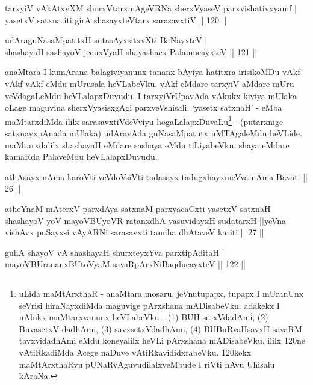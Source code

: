 \begin{shl}
tarxyiV vAkAtxvXM shorxVtarxmAgeVRNa sherxVyaseV parxvishativxyamf | \\
yasetxV satxna iti girA shasayxteV\s tarx sarasavxtiV \hfill|| 120 || 
\end{shl}

\begin{shl}
udAraguNasaMpatitxH sutasAyxsitxvXti BaNayxteV | \\
shashayaH sashayoV jecnxVyaH shayashacx PalamucayxteV \hfill|| 121 || 
\end{shl}

\begin{artha}
anaMtara I kumArana balagiviyanunx tananx bAyiya hatitxra irisikoMDu 
vAkf vAkf vAkf eMdu mUrusala heVLabeVku. vAkf eMdare tarxyiV aMdare 
mUru veVdagaLeMdu heVLalapxDuvudu. I tarxyiVrUpavAda vAkukx kiviya 
mUlaka oLage maguvina sherxVyasisxgAgi parxveVshisali. `yasetx satxnaH' 
- eMba maMtarxdiMda ililx sarasavxtiVdeVviyu 
hogaLalapxDuvaLu\footnote{uLida maMtArxthaR - anaMtara mosaru, 
jeVnutupapx, tupapx I mUranUnx seVrisi hiraNayxdiMda maguvige 
pArxshana mADisabeVku. adakekx I nAlukx maMtarxvanunx heVLabeVku - (1) 
BUH setxVdadAmi, (2) BuvasetxV dadhAmi, (3) savxsetxVdadhAmi, (4) 
BUBuRvaHsavxH savaRM tavxyidadhAmi eMdu koneyalilx heVLi pArxshana 
mADisabeVku. ililx 120ne vAtiRkadiMda Acege naDuve 
vAtiRkavididxrabeVku. 120kekx maMtArxthaRvu pUNaRvAguvudilalxveMbude I 
riVti nAvu Uhisalu kAraNa.} - (putarxnige satxnayxpAnada mUlaka) 
udAravAda guNasaMpatutx uMTAgaleMdu heVLide. maMtarxdalilx shashayaH 
eMdare sashaya eMdu tiLiyabeVku. shaya eMdare kamaRda PalaveMdu 
heVLalapxDuvudu.
\end{artha}

\begin{kandikeshl}
athAsayx nAma karoVti veVdoV\s siVti tadasayx tadugxhayxmeVva nAma Bavati || 26 ||
\end{kandikeshl}

\begin{kandikeshl}
atheYnaM mAterxV parxdAya satxnaM parxyacaCxti yasetxV satxnaH shashayoV yoV mayoVBUyoVR ratanxdhA vasuvidayxH sudatarxH ||yeVna vishAvx puSayxsi vAyARNi sarasavxti tamiha dhAtaveV kariti || 27 ||
\end{kandikeshl}

\begin{shl}
guhA shayoV vA shashayaH shurxteyxYva parxtipAditaH | \\
mayoVBUrananxBUtoV\s yaM savaRpArxNiBaqducayxteV \hfill|| 122 || 
\end{shl}


